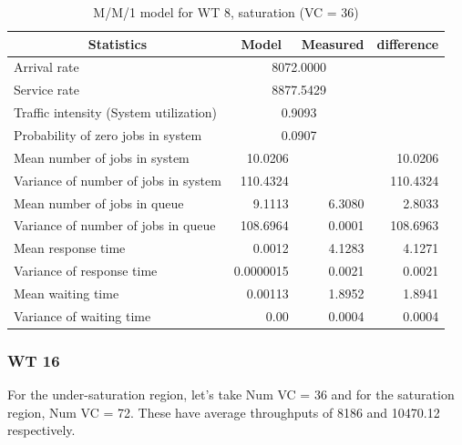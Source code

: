 \documentclass[11pt,a4paper]{article}
\begin{document}
\begin{table}[H]
	\centering
	\caption{M/M/1 model for WT 8, saturation (VC = 36)}
	\begin{tabular}{|l|r|l|r|}
		\hline
		\multicolumn{1}{|c|}{Statistics} & \multicolumn{1}{c|}{Model} & \multicolumn{1}{c|}{Measured} & \multicolumn{1}{c|}{difference} \\ \hline
		Arrival rate & \multicolumn{ 2}{c|}{8072.0000} & \multicolumn{1}{l|}{} \\ \hline
		Service rate & \multicolumn{ 2}{c|}{8877.5429} & \multicolumn{1}{l|}{} \\ \hline
		Traffic intensity (System utilization) & \multicolumn{ 2}{c|}{0.9093} & \multicolumn{1}{l|}{} \\ \hline
		Probability of zero jobs in system & \multicolumn{ 2}{c|}{0.0907} & \multicolumn{1}{l|}{} \\ \hline
		Mean number of jobs in system & 10.0206 &  & 10.0206 \\ \hline
		Variance of number of jobs in system & 110.4324 &  & 110.4324 \\ \hline
		Mean number of jobs in queue & 9.1113 & \multicolumn{1}{r|}{6.3080} & 2.8033 \\ \hline
		Variance of number of jobs in queue & 108.6964 & \multicolumn{1}{r|}{0.0001} & 108.6963 \\ \hline
		Mean response time & 0.0012 & \multicolumn{1}{r|}{4.1283} & 4.1271 \\ \hline
		Variance of response time & 0.0000015 & \multicolumn{1}{r|}{0.0021} & 0.0021 \\ \hline
		Mean waiting time & 0.00113 & \multicolumn{1}{r|}{1.8952} & 1.8941 \\ \hline
		Variance of waiting time & 0.00 & \multicolumn{1}{r|}{0.0004} & 0.0004 \\ \hline
	\end{tabular}
	\label{}
\end{table}


\subsubsection{WT 16}
For the under-saturation region, let's take Num VC = 36 and for the saturation region, Num VC = 72. These have average throughputs of 8186 and 10470.12 respectively.
\end{document}
